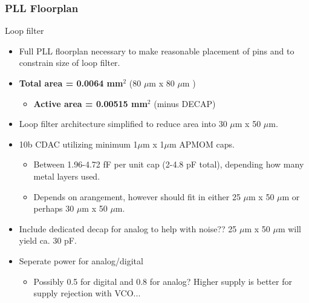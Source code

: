 \documentclass[t, screen, aspectratio=43]{beamer}
\begin{document}
\begin{frame}
	\frametitle{PLL Floorplan}
	\begin{block}{Loop filter}
		\begin{minipage}{6cm}
			\vspace{1em}
			\tiny

			\begin{itemize}[itemsep=4pt,label=\protect---]
				\item Full PLL floorplan necessary to make reasonable placement of pins and to constrain size of loop filter.
				\item {\color{red}\textbf{Total area = 0.0064 mm$^2$}} (80 $\mu$m x 80 $\mu$m )
				\begin{itemize}[itemsep=4pt,label=\protect$\bullet$]
						\item \textbf{Active area = 0.00515 mm$^2$} (minus DECAP)
					\end{itemize}
				\item Loop filter architecture simplified to reduce area into 30 $\mu$m x 50 $\mu$m.
				\item 10b CDAC utilizing minimum 1$\mu$m x 1$\mu$m APMOM caps.
					\begin{itemize}[itemsep=4pt,label=\protect$\bullet$]
						\item Between 1.96-4.72 fF per unit cap (2-4.8 pF total), depending how many metal layers used.
						\item Depends on arangement, however should fit in either 25 $\mu$m x 50 $\mu$m or perhaps 30 $\mu$m x 50 $\mu$m.
					\end{itemize}
				\item Include dedicated decap for analog to help with noise?? 25 $\mu$m x 50 $\mu$m will yield ca. 30 pF.
				\item Seperate power for analog/digital
					\begin{itemize}[itemsep=4pt,label=\protect$\bullet$]
						\item Possibly 0.5 for digital and 0.8 for analog? Higher supply is better for supply rejection with VCO...
					\end{itemize}
			\end{itemize}


\end{minipage}
\end{block}
\end{frame}
\end{document}
